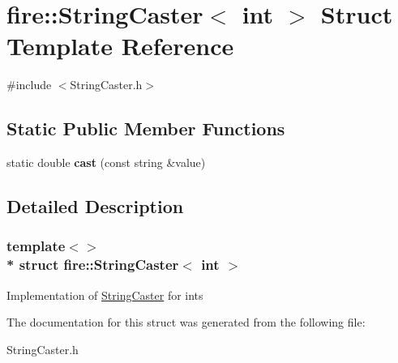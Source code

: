 \hypertarget{a00296}{}\section{fire\+:\+:String\+Caster$<$ int $>$ Struct Template Reference}
\label{a00296}


{\ttfamily \#include $<$String\+Caster.\+h$>$}

\subsection*{Static Public Member Functions}
\begin{DoxyCompactItemize}
\item 
static double {\bfseries cast} (const string \&value)\hypertarget{a00296_a62373040bdd4acb9e2c890d83829e22f}{}\label{a00296_a62373040bdd4acb9e2c890d83829e22f}

\end{DoxyCompactItemize}


\subsection{Detailed Description}
\subsubsection*{template$<$$>$\\*
struct fire\+::\+String\+Caster$<$ int $>$}

Implementation of \hyperlink{a00292}{String\+Caster} for ints 

The documentation for this struct was generated from the following file\+:\begin{DoxyCompactItemize}
\item 
String\+Caster.\+h\end{DoxyCompactItemize}
